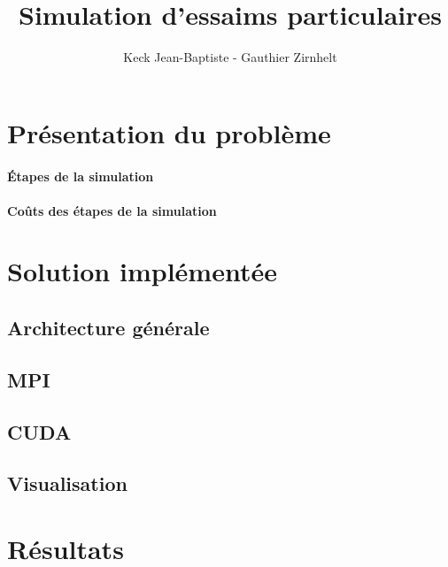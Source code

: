 \documentclass[12pt,a4paper,sans]{article}
\title{Simulation d'essaims particulaires}
\author{Keck Jean-Baptiste - Gauthier Zirnhelt}
\begin{document}
\maketitle

\section{Présentation du problème}
\paragraph{Étapes de la simulation}
\paragraph{Coûts des étapes de la simulation}

\section{Solution implémentée}
\subsection{Architecture générale}
\subsection{MPI}
\subsection{CUDA}
\subsection{Visualisation}

\section{Résultats}

\end{document}
